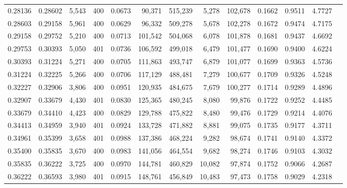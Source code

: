 \begin{tabular}{rrrrrrrrrrrrr}
0.28136 & 0.28602 & 5,543 & 400 &                                     0.0673 &  90,371 & 515,239 &   5,278 & 102,678 & 0.1662 & 0.9511 & 4.7727 \\
0.28603 & 0.29158 & 5,961 & 400 &                                     0.0629 &  96,332 & 509,278 &   5,678 & 102,278 & 0.1672 & 0.9474 & 4.7175 \\
0.29158 & 0.29752 & 5,210 & 400 &                                     0.0713 & 101,542 & 504,068 &   6,078 & 101,878 & 0.1681 & 0.9437 & 4.6692 \\
0.29753 & 0.30393 & 5,050 & 401 &                                     0.0736 & 106,592 & 499,018 &   6,479 & 101,477 & 0.1690 & 0.9400 & 4.6224 \\
0.30393 & 0.31224 & 5,271 & 400 &                                     0.0705 & 111,863 & 493,747 &   6,879 & 101,077 & 0.1699 & 0.9363 & 4.5736 \\
0.31224 & 0.32225 & 5,266 & 400 &                                     0.0706 & 117,129 & 488,481 &   7,279 & 100,677 & 0.1709 & 0.9326 & 4.5248 \\
0.32227 & 0.32906 & 3,806 & 400 &                                     0.0951 & 120,935 & 484,675 &   7,679 & 100,277 & 0.1714 & 0.9289 & 4.4896 \\
0.32907 & 0.33679 & 4,430 & 401 &                                     0.0830 & 125,365 & 480,245 &   8,080 &  99,876 & 0.1722 & 0.9252 & 4.4485 \\
0.33679 & 0.34410 & 4,423 & 400 &                                     0.0829 & 129,788 & 475,822 &   8,480 &  99,476 & 0.1729 & 0.9214 & 4.4076 \\
0.34413 & 0.34959 & 3,940 & 401 &                                     0.0924 & 133,728 & 471,882 &   8,881 &  99,075 & 0.1735 & 0.9177 & 4.3711 \\
0.34961 & 0.35399 & 3,658 & 401 &                                     0.0988 & 137,386 & 468,224 &   9,282 &  98,674 & 0.1741 & 0.9140 & 4.3372 \\
0.35400 & 0.35835 & 3,670 & 400 &                                     0.0983 & 141,056 & 464,554 &   9,682 &  98,274 & 0.1746 & 0.9103 & 4.3032 \\
0.35835 & 0.36222 & 3,725 & 400 &                                     0.0970 & 144,781 & 460,829 &  10,082 &  97,874 & 0.1752 & 0.9066 & 4.2687 \\
0.36222 & 0.36593 & 3,980 & 401 &                                     0.0915 & 148,761 & 456,849 &  10,483 &  97,473 & 0.1758 & 0.9029 & 4.2318 \\

\end{tabular}
